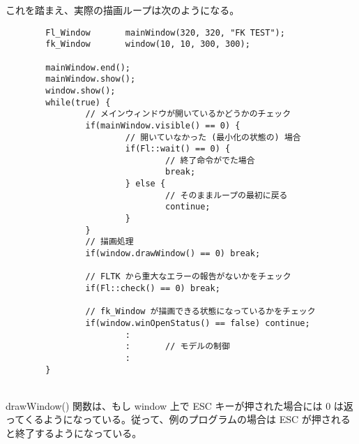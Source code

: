 これを踏まえ、実際の描画ループは次のようになる。
\\
\begin{breakbox}
\begin{verbatim}
        Fl_Window       mainWindow(320, 320, "FK TEST");
        fk_Window       window(10, 10, 300, 300);

        mainWindow.end();
        mainWindow.show();      
        window.show();
        while(true) {
                // メインウィンドウが開いているかどうかのチェック
                if(mainWindow.visible() == 0) {
                        // 開いていなかった (最小化の状態の) 場合
                        if(Fl::wait() == 0) {
                                // 終了命令がでた場合
                                break;
                        } else {
                                // そのままループの最初に戻る
                                continue;
                        }
                }
                // 描画処理
                if(window.drawWindow() == 0) break;

                // FLTK から重大なエラーの報告がないかをチェック
                if(Fl::check() == 0) break;

                // fk_Window が描画できる状態になっているかをチェック
                if(window.winOpenStatus() == false) continue;
                        :
                        :       // モデルの制御
                        :
        }       
\end{verbatim}
\end{breakbox}
~ \\
drawWindow() 関数は、もし window 上で ESC キーが押された場合には
0 は返ってくるようになっている。従って、例のプログラムの場合は
ESC が押されると終了するようになっている。


